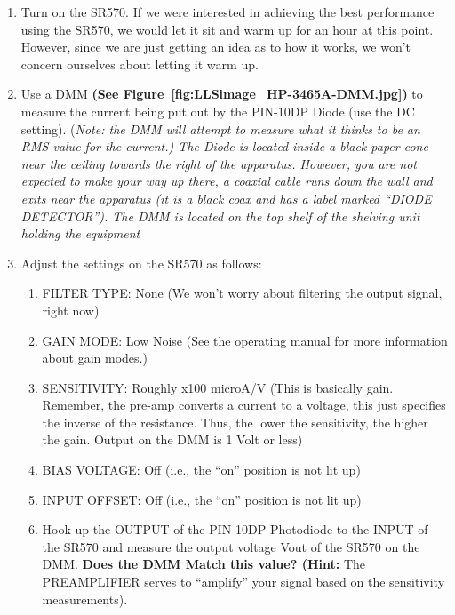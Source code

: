 \documentclass{../lab}
\begin{document}
\begin{enumerate}
    \item Turn on the SR570. If we were interested in achieving the best performance using the SR570, we would let it sit and warm up for an hour at this point. However, since we are just getting an idea as to how it works, we won't concern ourselves about letting it warm up.

    \item Use a DMM \textbf{(See Figure~\ref{fig:LLSimage_HP-3465A-DMM.jpg})} to measure the current being put out by the PIN-10DP Diode (use the DC setting). (\emph{Note: the DMM will attempt to measure what it thinks to be an RMS value for the current.) The Diode is located inside a black paper cone near the ceiling towards the right of the apparatus. However, you are not expected to make your way up there, a coaxial cable runs down the wall and exits near the apparatus (it is a black coax and has a label marked ``DIODE DETECTOR''). The DMM is located on the top shelf of the shelving unit holding the equipment}

    \item Adjust the settings on the SR570 as follows:
    \begin{enumerate}
        \item FILTER TYPE: None (We won't worry about filtering the output signal, right now)

        \item GAIN MODE: Low Noise (See the operating manual for more information about gain modes.)

        \item SENSITIVITY: Roughly x100 microA/V (This is basically gain. Remember, the pre-amp converts a current to a voltage, this just specifies the inverse of the resistance. Thus, the lower the sensitivity, the higher the gain. Output on the DMM is 1 Volt or less)

        \item BIAS VOLTAGE: Off (i.e., the ``on'' position is not lit up)

        \item INPUT OFFSET: Off (i.e., the ``on'' position is not lit up)

        \item Hook up the OUTPUT of the PIN-10DP Photodiode to the INPUT of the SR570 and measure the output voltage Vout of the SR570 on the DMM. \textbf{Does the DMM Match this value? (Hint: }The PREAMPLIFIER serves to ``amplify'' your signal based on the sensitivity measurements).

    \end{enumerate}

\end{enumerate}
\end{document}
